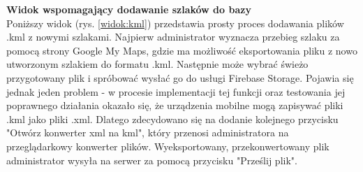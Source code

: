 \noindent
\textbf{Widok wspomagający dodawanie szlaków do bazy} \\ 
\indent Poniższy widok (rys. \ref{widok:kml}) przedstawia prosty proces dodawania plików .kml z nowymi szlakami. Najpierw administrator wyznacza przebieg szlaku za pomocą strony Google My Maps, gdzie ma możliwość eksportowania pliku z nowo utworzonym szlakiem do formatu .kml. Następnie może wybrać świeżo przygotowany plik i spróbować wysłać go do usługi Firebase Storage. Pojawia się jednak jeden problem - w procesie implementacji tej funkcji oraz testowania jej poprawnego działania okazało się, że urządzenia mobilne mogą zapisywać pliki .kml jako pliki .xml. Dlatego zdecydowano się na dodanie kolejnego przycisku "Otwórz konwerter xml na kml", który przenosi administratora na przeglądarkowy konwerter plików. Wyeksportowany, przekonwertowany plik administrator wysyła na serwer za pomocą przycisku "Prześlij plik".
